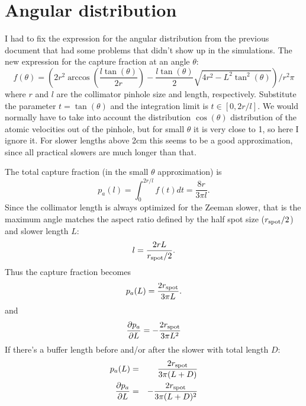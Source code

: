 \documentclass[10pt,a4paper]{article}
\begin{document}
\section{Angular distribution}

I had to fix the expression for the angular distribution from the previous document that had some problems that didn't show up in the simulations. The new expression for the capture fraction at an angle $\theta$:
\begin{equation}
f(\theta) =  \left(2 r^2 \arccos\left(\frac {l \tan(\theta)}{2 r} \right) - \frac{l \tan(\theta)}{2}\sqrt{4 r^2 - L^2 \tan^2(\theta)}\right) / r^2 \pi
\end{equation}
where $r$ and $l$ are the collimator pinhole size and length, respectively. Substitute the parameter $t = \tan(\theta)$ and the integration limit is $t \in [0, 2 r / l]$. We would normally have to take into account the distribution $\cos(\theta)$ distribution of the atomic velocities out of the pinhole, but for small $\theta$ it is very close to 1, so here I ignore it. For slower lengths above 2cm this seems to be a good approximation, since all practical slowers are much longer than that.

The total capture fraction (in the small $\theta$ approximation) is
\begin{equation}
p_a(l) = \int_0^{2r/l} f(t) dt = \frac{8 r}{3 \pi l}.
\end{equation}
Since the collimator length is always optimized for the Zeeman slower, that is the maximum angle matches the aspect ratio defined by the half spot size ($r_{\rm spot}/2$) and slower length $L$:
\begin{equation}
l = \frac{2 r L}{r_{\rm spot} / 2}.
\end{equation}
Thus the capture fraction becomes
\begin{equation}
p_a(L) = \frac{2 r_{\rm spot}}{3 \pi L}.
\label{eq:anglefraction}
\end{equation}
and
\begin{equation}
\frac{\partial p_a}{\partial L} = -\frac{2 r_{\rm spot}}{3 \pi L^2}
\end{equation}
If there's a buffer length before and/or after the slower with total length $D$:
\begin{eqnarray}
p_a(L) &=& \frac{2 r_{\rm spot}}{3 \pi (L+D)} \\
\frac{\partial p_a}{\partial L} &=& -\frac{2 r_{\rm spot}}{3 \pi (L+D)^2}
\end{eqnarray}
\end{document}
